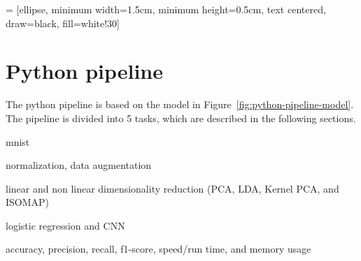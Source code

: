  = [ellipse, minimum width=1.5cm, minimum height=0.5cm, text centered, draw=black, fill=white!30]
\section{Python pipeline}\label{sec:python-pipeline}
The python pipeline is based on the model in Figure~\ref{fig:python-pipeline-model}. The pipeline is divided into 5 tasks, which are described in the following sections. 
\begin{description}
    \setlength\itemsep{0em}
    \item[dataset] mnist
    \item[pre-preprocessing] normalization, data augmentation
    \item[preprocessing] linear and non linear dimensionality reduction (PCA, LDA, Kernel PCA, and ISOMAP)
    \item[models] logistic regression and CNN
    \item[evaluation] accuracy, precision, recall, f1-score, speed/run time, and memory usage
\end{description}


